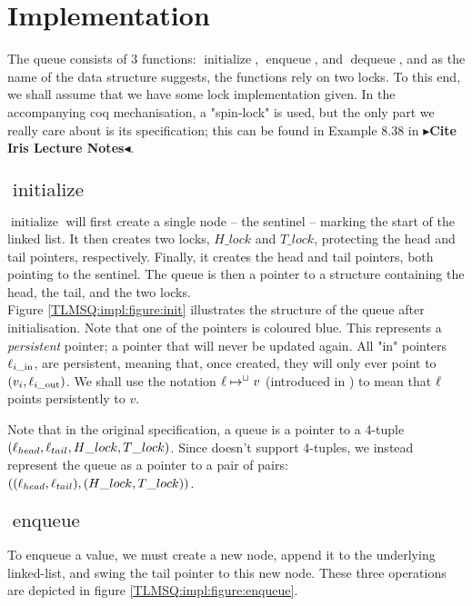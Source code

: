 \documentclass[a4paper, 11pt]{report}
\newcommand{\initialise}{\operatorname{initialize}}
\newcommand{\enqueue}{\operatorname{enqueue}}
\newcommand{\dequeue}{\operatorname{dequeue}}
\newcommand{\locin}[1]{\loc_{#1\_\text{in}}}
\newcommand{\locout}[1]{\loc_{#1\_\text{out}}}
\newcommand{\todo}[1]{{\color[rgb]{.5,0,0}\textbf{$\blacktriangleright$#1$\blacktriangleleft$}}}
\begin{document}
\section{Implementation}
\label{TLMSQ:section:implementation}

The queue consists of 3 functions: $\initialise$, $\enqueue$, and $\dequeue$, and as the name of the data structure suggests, the functions rely on two locks. To this end, we shall assume that we have some lock implementation given. In the accompanying coq mechanisation, a "spin-lock" is used, but the only part we really care about is its specification; this can be found in Example 8.38 in \todo{Cite Iris Lecture Notes}.

\subsection[initialise]{$\initialise$}

$\initialise$ will first create a single node -- the sentinel -- marking the start of the linked list. It then creates two locks, $H\_lock$ and $T\_lock$, protecting the head and tail pointers, respectively. Finally, it creates the head and tail pointers, both pointing to the sentinel. The queue is then a pointer to a structure containing the head, the tail, and the two locks.\\
Figure \ref{TLMSQ:impl:figure:init} illustrates the structure of the queue after initialisation. Note that one of the pointers is coloured blue. This represents a \emph{persistent} pointer; a pointer that will never be updated again. All "in" pointers $\locin{i}$, are persistent, meaning that, once created, they will only ever point to $(v_i, \locout{i})$. We shall use the notation $\ell \mapsto^{\mathop{\Box}} v$ (introduced in \cite{DBLP:conf/cpp/VindumB21}) to mean that $\ell$ points persistently to $v$.

Note that in the original specification, a queue is a pointer to a 4-tuple $(\ell_{head}, \ell_{tail}, H\_lock, T\_lock)$. Since \heaplang doesn't support 4-tuples, we instead represent the queue as a pointer to a pair of pairs: $((\ell_{head}, \ell_{tail}), (H\_lock, T\_lock))$.


\subsection[enqueue]{$\enqueue$}

To enqueue a value, we must create a new node, append it to the underlying linked-list, and swing the tail pointer to this new node. These three operations are depicted in figure \ref{TLMSQ:impl:figure:enqueue}.
\end{document}
